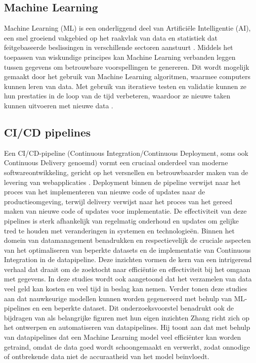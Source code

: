 \subsection{Machine Learning}
Machine Learning (ML) is een onderliggend deel van Artificiële Intelligentie (AI), een snel groeiend vakgebied op het raakvlak van data en statistiek dat feitgebaseerde beslissingen in verschillende sectoren aanstuurt \autocite{Jordan2015}.
Middels het toepassen van wiskundige principes kan Machine Learning verbanden leggen tussen gegevens om betrouwbare voorspellingen te genereren. Dit wordt mogelijk gemaakt door het gebruik van Machine Learning algoritmen, waarmee computers kunnen leren van data. Met gebruik van iteratieve testen en validatie kunnen ze hun prestaties in de loop van de tijd verbeteren, waardoor ze nieuwe taken kunnen uitvoeren met nieuwe data \autocite{Shaveta2023}.
\subsection{CI/CD pipelines}
Een CI/CD-pipeline (Continuous Integration/Continuous Deployment, soms ook Continuous Delivery genoemd) vormt een cruciaal onderdeel van moderne softwareontwikkeling, gericht op het versnellen en betrouwbaarder maken van de levering van webapplicaties \autocite{Singh2023}. Deployment binnen de pipeline verwijst naar het proces van het implementeren van nieuwe code of updates naar de productieomgeving, terwijl delivery verwijst naar het proces van het gereed maken van nieuwe code of updates voor implementatie. De effectiviteit van deze pipelines is sterk afhankelijk van regelmatig onderhoud en updates om gelijke tred te houden met veranderingen in systemen en technologieën. Binnen het domein van datamanagement benadrukken \textcite{Samad2018} en \textcite{RMV2020} respectievelijk de cruciale aspecten van het optimaliseren van beperkte datasets en de implementatie van Continuous Integration in de datapipeline. Deze inzichten vormen de kern van een intrigerend verhaal dat draait om de zoektocht naar efficiëntie en effectiviteit bij het omgaan met gegevens. In deze studies wordt ook aangetoond dat het verzamelen van data veel geld kan kosten en veel tijd in beslag kan nemen. Verder tonen deze studies aan dat nauwkeurige modellen kunnen worden gegenereerd met behulp van ML-pipelines en een beperkte dataset. Dit onderzoeksvoorstel benadrukt ook de bijdragen van \textcite{Zhang2022} als belangrijke figuren met hun eigen inzichten
Zhang richt zich op het ontwerpen en automatiseren van datapipelines. Hij toont aan dat met behulp van datapipelines dat een Machine Learning model veel efficiënter kan worden getraind, omdat de data goed wordt schoongemaakt en verwerkt, zodat onnodige of ontbrekende data niet de accuraatheid van het model beïnvloedt.
